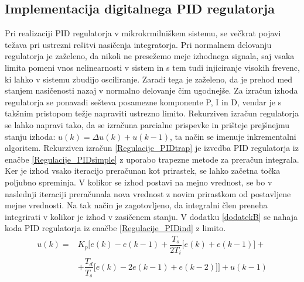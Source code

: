 \documentclass[a4paper,twoside,openright,12pt]{book}
\begin{document}
{	\subsection{Implementacija digitalnega PID regulatorja}
	Pri realizaciji PID regulatorja v mikrokrmilniškem sistemu, se večkrat pojavi težava pri ustrezni rešitvi nasičenja integratorja. Pri normalnem delovanju regulatorja je zaželeno, da nikoli ne presežemo meje izhodnega signala, saj vsaka limita pomeni vnos nelinearnosti v sistem in s tem tudi injiciranje visokih frevenc, ki lahko v sistemu zbudijo osciliranje. Zaradi tega je zaželeno, da je prehod med stanjem nasičenosti nazaj v normalno delovanje čim ugodnejše. Za izračun izhoda regulatorja se ponavadi sešteva posamezne komponente P, I in D, vendar je s takšnim pristopom težje napraviti ustrezno limito. Rekurziven izračun regulatorja se lahko napravi tako, da se izračuna parcialne prispevke in prišteje prejšnejmu stanju izhoda: $u(k)= \Delta u(k) + u(k-1)$, ta način se imenuje inkrementalni algoritem. Rekurziven izračun \ref{Regulacije_PIDtrap} je izvedba PID regulatorja iz enačbe \ref{Regulacije_PIDsimple} z uporabo trapezne metode za preračun integrala. Ker je izhod vsako iteracijo preračunan kot prirastek, se lahko začetna točka poljubno spreminja. V kolikor se izhod postavi na mejno vrednost, se bo v naslednji iteraciji preračunala nova vrednost z novim prirastkom od postavljene mejne vrednosti. Na tak način je zagotovljeno, da integralni člen preneha integrirati v kolikor je izhod v zasičenem stanju. V dodatku \ref{dodatekB} se nahaja koda PID regulatorja iz enačbe \ref{Regulacije_PIDind} z limito.  
	\begin{equation} \label{Regulacije_PIDtrap}
	\begin{aligned}
	u(k) = & K_p \bigg[ e(k)-e(k-1)+\dfrac{T_s}{2T_i}\big[ e(k)+e(k-1)\big] +\\
	&+\dfrac{T_d}{T_s}\big[ e(k)-2e(k-1)+e(k-2)\big] \bigg] + u(k-1)
	\end{aligned}
	\end{equation}
}
\end{document}
